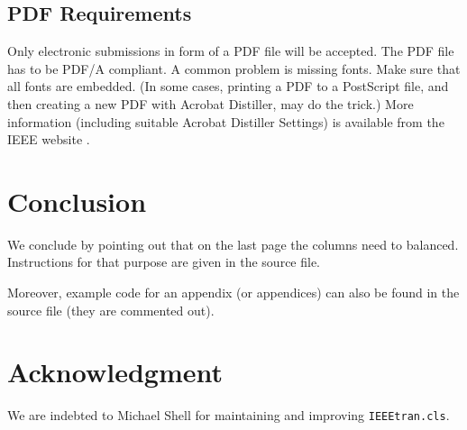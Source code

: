 \documentclass[conference,letterpaper]{IEEEtran}
\begin{document}
\subsection{PDF Requirements}

Only electronic submissions in form of a PDF file will be
accepted. The PDF file has to be PDF/A compliant. A common problem is
missing fonts. Make sure that all fonts are embedded. (In some cases,
printing a PDF to a PostScript file, and then creating a new PDF with
Acrobat Distiller, may do the trick.) More information (including
suitable Acrobat Distiller Settings) is available from the IEEE
website \cite{IEEE:pdfsettings, IEEE:AuthorToolbox}.


\section{Conclusion}

We conclude by pointing out that on the last page the columns need to
balanced. Instructions for that purpose are given in the source file.

Moreover, example code for an appendix (or appendices) can also be
found in the source file (they are commented out).


\section*{Acknowledgment}

We are indebted to Michael Shell for maintaining and improving
\texttt{IEEEtran.cls}. 


\end{document}
